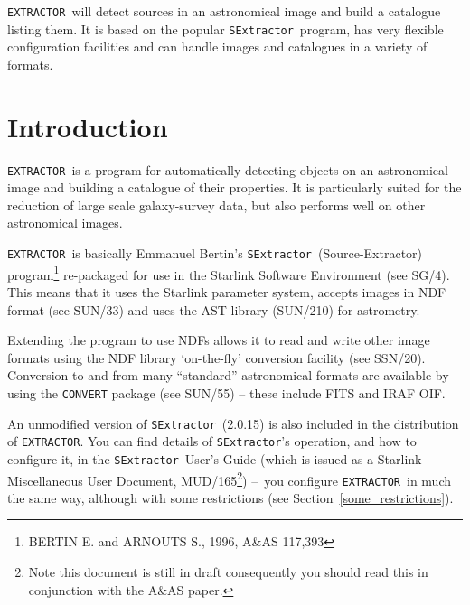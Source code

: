 \documentclass[twoside,11pt]{article}
\newcommand{\stardocinitials}  {SUN}
\newcommand{\stardocnumber}    {225.1}
\newcommand{\stardocabstract}  {\EXTRACTOR\ will detect sources in
an astronomical image and build a catalogue listing them. It is based on the
popular \SExtractor\ program, has very flexible configuration
facilities and can handle images and catalogues in a variety of formats.}
\newcommand{\stardocname}{\stardocinitials /\stardocnumber}
\newcommand{\htmladdnormallink}[2]{#1}
\newcommand{\htmlref}[2]{#1}
\newenvironment{latexonly}{}{}
\newcommand{\latex}[1]{#1}
\newcommand{\xref}[3]{#1}
\newcommand{\xlabel}[1]{}
\renewcommand{\_}{\texttt{\symbol{95}}}
\newcommand{\EXTRACTOR}{\texttt{EXTRACTOR}}
\newcommand{\CONVERT}{\texttt{CONVERT}}
\newcommand{\SExtractor}{\texttt{SExtractor}}
\newcommand{\IRAFURL}{http://star-www.rl.ac.uk/iraf/web/iraf-homepage.html}
\newcommand{\FITSURL}{http://fits.gsfc.nasa.gov/}
\newcommand{\MUD}{mud165.ps}
\newcommand{\dash}{--}
\newcommand{\dash}{-}
\renewcommand{\thepage}{\roman{page}}
\begin{document}
\stardocabstract
  \newpage
  \begin{latexonly}
    \setlength{\parskip}{0mm}
    \tableofcontents
    \setlength{\parskip}{\medskipamount}
    \markboth{\stardocname}{\stardocname}
  \end{latexonly}
\cleardoublepage
\renewcommand{\thepage}{\arabic{page}}
\setcounter{page}{1}

\section{\xlabel{introduction}Introduction}
\EXTRACTOR\ is a program for automatically detecting objects on an
astronomical image and building a catalogue of their properties. It is
particularly suited for the reduction of large scale galaxy-survey
data, but also performs well on other astronomical images.

\EXTRACTOR\ is basically Emmanuel Bertin's \SExtractor\
(Source-Extractor) program\footnote{BERTIN E. and ARNOUTS S., 1996,
A\&AS 117,393} re-packaged for use in the \xref{Starlink Software
Environment}{sg4}{}\latex{ (see SG/4)}.  This means that it uses the
Starlink parameter system, accepts images in
\xref{NDF}{sun33}{abstract} format \latex{(see SUN/33)} and uses the
\xref{AST}{sun210}{} library \latex{(SUN/210)} for astrometry.

Extending the program to use NDFs allows it to read and write other
image formats using the NDF library \xref{`on-the-fly' conversion
facility}{ssn20}{abstract} \latex{(see SSN/20)}.  Conversion to and
from many ``standard'' astronomical
\xref{formats}{sun55}{the_default_conversion_commands} are available
by using the \xref{\CONVERT}{sun55}{abstract} package \latex{(see
SUN/55)} -- these include \htmladdnormallink{FITS}{\FITSURL} and
\htmladdnormallink{IRAF}{\IRAFURL} OIF.

An unmodified version of \SExtractor\ (2.0.15) is also included in the
distribution of \EXTRACTOR.  You can find details of \SExtractor's
operation, and how to configure it, in the
\htmladdnormallink{\SExtractor\ User's Guide}{\MUD} (which is issued
as a Starlink Miscellaneous User Document, MUD/165\footnote{Note this
document is still in draft consequently you should read this in
conjunction with the A\&AS paper.}) \dash\ you configure \EXTRACTOR\
in much the same way, although with 
\htmlref{some restrictions}{some_restrictions}
\latex{(see Section~\ref{some_restrictions})}.
\end{document}
